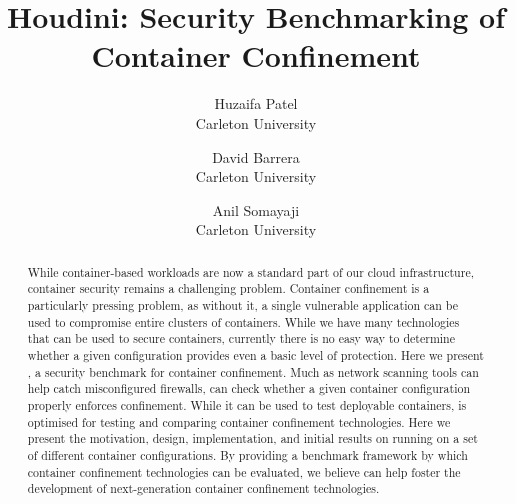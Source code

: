 \documentclass[letterpaper,twocolumn,10pt]{article}
\begin{document}


\title{\Large \bf Houdini: Security Benchmarking of Container Confinement}
\author{
{\rm Huzaifa Patel}\\
Carleton University
\and
{\rm David Barrera}\\
Carleton University
\and
{\rm Anil Somayaji}\\
Carleton University
} %

\maketitle

\begin{abstract}
  While container-based workloads are now a standard part of our cloud infrastructure, container security remains a challenging problem. Container confinement is a particularly pressing problem, as without it, a single vulnerable application can be used to compromise entire clusters of containers. While we have many technologies that can be used to secure containers, currently there is no easy way to determine whether a given configuration provides even a basic level of protection. Here we present \houdini, a security benchmark for container confinement. Much as network scanning tools can help catch misconfigured firewalls, \houdini can check whether a given container configuration properly enforces confinement. While it can be used to test deployable containers, \houdini is optimised for testing and comparing container confinement technologies. Here we present the motivation, design, implementation, and initial results on running \houdini on a set of different container configurations. By providing a benchmark framework by which container confinement technologies can be evaluated, we believe \houdini can help foster the development of next-generation container confinement technologies.
\end{abstract}







% 






\end{document}
